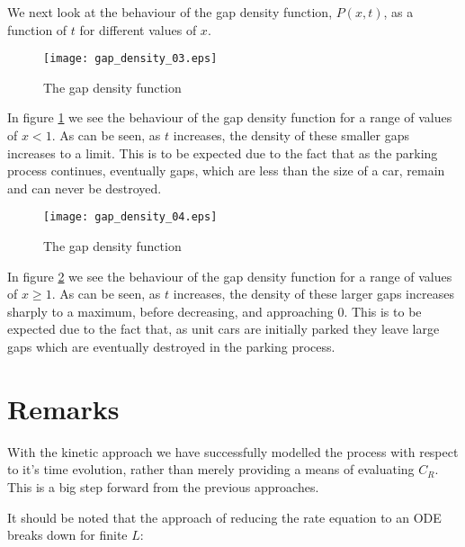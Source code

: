 \newpage

We next look at the behaviour of the gap density function, $P(x, t)$, as a function of $t$ 
for different values of $x$. \bigskip

\begin{figure}[h!]
	\centering
	\texttt{[image: gap\_density\_03.eps]}
	\caption{The gap density function}
	\label{fig:gdf3}
\end{figure}\medskip

In figure \ref{fig:gdf3} we see the behaviour of the gap density function for a range of 
values of $x < 1$. As can be seen, as $t$ increases, the density of these smaller gaps 
increases to a limit. This is to be expected due to the fact that as the parking process 
continues, eventually gaps, which are less than the size of a car, remain and can never 
be destroyed. \bigskip

\begin{figure}[h!]
	\centering
	\texttt{[image: gap\_density\_04.eps]}
	\caption{The gap density function}
	\label{fig:gdf4}
\end{figure}\medskip

In figure \ref{fig:gdf4} we see the behaviour of the gap density function for a range of 
values of $x \geq 1$. As can be seen, as $t$ increases, the density of these larger gaps 
increases sharply to a maximum, before decreasing, and approaching $0$. This is to be 
expected due to the fact that, as unit cars are initially parked they leave large gaps 
which are eventually destroyed in the parking process. \bigskip











\section{Remarks}

With the kinetic approach we have successfully modelled the process with respect to it's 
time evolution, rather than merely providing a means of evaluating $C_R$. This is a big 
step forward from the previous approaches. \bigskip

It should be noted that the approach of reducing the rate equation to an ODE breaks down 
for finite $L$: \bigskip

